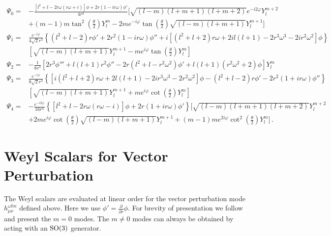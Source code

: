 \documentclass{brownthesis}
\begin{document}
\begin{align*}
\Psi_0= & -\frac{[l^2+l-2r\omega(r\omega+i)]\phi+2r(1-ir\omega)\phi'}{4r^3}\Bigg[\sqrt{(l-m)(l+m+1)(l+m+2)}e^{-i2\varphi}Y_{l}^{m+2}\\
  & +(m-1)m\tan^{2}\left(\frac{\theta}{2}\right)Y_{l}^{m} -2me^{-i\varphi}\tan\left(\frac{\theta}{2}\right)\sqrt{(l-m)(l+m+1)}Y_{l}^{m+1}\Bigg]\\
\Psi_{1}= & \frac{e^{-i\varphi}}{4\sqrt{2}r^{3}}\left\{\left(l^{2}+l-2\right)r\phi'+2r^2(1-ir\omega)\phi''+i\left[\left(l^{2}+l+2\right)r\omega+2il(l+1)-2r^{3}\omega^{3}-2ir^{2}\omega^{2}\right]\phi\right\}\\
 & \left[\sqrt{(l-m)(l+m+1)}Y_{l}^{m+1}-me^{i\varphi}\tan\left(\frac{\theta}{2}\right)Y_{l}^{m}\right]\\
\Psi_{2}= & -\frac{1}{8r^{3}}\left[2r^3\phi'''+l(l+1)r^2\phi''-2r\left(l^{2}+l-r^{2}\omega^{2}\right)\phi'+l(l+1)\left(r^{2}\omega^{2}+2\right)\phi\right]Y_{l}^{m}\\
 \Psi_{3}= & \frac{e^{-i\varphi}}{8\sqrt{2}r^{3}}\left\{\left[i\left(l^{2}+l+2\right)r\omega+2l(l+1)-2ir^{3}\omega^{3}-2r^{2}\omega^{2}\right]\phi-\left(l^{2}+l-2\right)r\phi'-2r^2(1+ir\omega)\phi''\right\}\\
  & \left[\sqrt{(l-m)(l+m+1)}Y_{l}^{m+1}+me^{i\varphi}\cot\left(\frac{\theta}{2}\right)Y_{l}^{m}\right]\\
 \Psi_{4}= & -\frac{e^{-i2\varphi}}{16r^{3}}\left\{\left[l^{2}+l-2r\omega(r\omega-i)\right]\phi+2r(1+ir\omega)\phi'\right\} \Bigg[\sqrt{(l-m)(l+m+1)(l+m+2)}Y_{l}^{m+2}\\
   &+2me^{i\varphi}\cot\left(\frac{\theta}{2}\right)\sqrt{(l-m)(l+m+1)}Y_{l}^{m+1}+(m-1)me^{2i\varphi}\cot^2\left(\frac{\theta}{2}\right)Y_{l}^{m}\Bigg]\,.
\end{align*}

\section{Weyl Scalars for Vector Perturbation}

The Weyl scalars are evaluated at linear order for the vector perturbation
mode $h_{\mu\nu}^{\omega lm}$ defined above. Here we use $\phi'=\frac{\partial}{\partial r}\phi$.
For brevity of presentation we follow \cite{PhysRev.108.1063} and
present the $m=0$ modes. The $m\neq0$ modes can always be obtained
by acting with an $\rm SO(3)$ generator.
\end{document}
